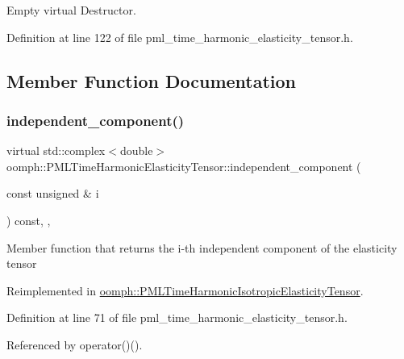 Empty virtual Destructor. 



Definition at line 122 of file pml\+\_\+time\+\_\+harmonic\+\_\+elasticity\+\_\+tensor.\+h.



\subsection{Member Function Documentation}
\mbox{\label{classoomph_1_1PMLTimeHarmonicElasticityTensor_a80876070e0c45dd00bbc21fe9c527a21}} 
\subsubsection{\texorpdfstring{independent\+\_\+component()}{independent\_component()}}
{\footnotesize\ttfamily virtual std\+::complex$<$double$>$ oomph\+::\+P\+M\+L\+Time\+Harmonic\+Elasticity\+Tensor\+::independent\+\_\+component (\begin{DoxyParamCaption}\item[{const unsigned \&}]{i }\end{DoxyParamCaption}) const\hspace{0.3cm}{\ttfamily [inline]}, {\ttfamily [protected]}, {\ttfamily [virtual]}}

Member function that returns the i-\/th independent component of the elasticity tensor 

Reimplemented in \hyperlink{classoomph_1_1PMLTimeHarmonicIsotropicElasticityTensor_a650332deea93cd5838fc614ac253ec1c}{oomph\+::\+P\+M\+L\+Time\+Harmonic\+Isotropic\+Elasticity\+Tensor}.



Definition at line 71 of file pml\+\_\+time\+\_\+harmonic\+\_\+elasticity\+\_\+tensor.\+h.



Referenced by operator()().

\mbox{\label{classoomph_1_1PMLTimeHarmonicElasticityTensor_ac253ca0d5530e06f9596a9be7bb728d2}} 
